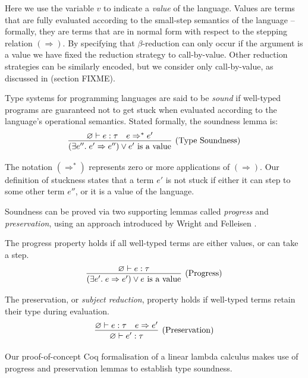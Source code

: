 \documentclass[]{unswthesis}
\let\emptyset\varnothing
\newcommand{\steps}{\Rightarrow}
\newcommand{\types}{\vdash}
\let\i\textit
\let\t\text
\begin{document}
Here we use the variable $v$ to indicate a \i{value} of the language. Values are terms that are fully evaluated according to the small-step semantics of the language \cite{tapl} -- formally, they are terms that are in normal form with respect to the stepping relation $(\steps)$. By specifying that $\beta$-reduction can only occur if the argument is a value we have fixed the reduction strategy to call-by-value. Other reduction strategies can be similarly encoded, but we consider only call-by-value, as discussed in (section FIXME).


Type systems for programming languages are said to be \i{sound} if well-typed programs are guaranteed not to get stuck when evaluated according to the language's operational semantics. Stated formally, the soundness lemma is:
\begin{eqnarray*}
\infer[\t{(Type Soundness)}]
{(\exists e''. \; e' \steps e'') \lor \t{$e'$ is a value}}
{\emptyset \types e : \tau  &  e \steps^* e'}
\end{eqnarray*}

The notation $(\steps^*)$ represents zero or more applications of $(\steps)$. Our definition of stuckness states that a term $e'$ is not stuck if either it can step to some other term $e''$, or it is a value of the language.

Soundness can be proved via two supporting lemmas called \i{progress} and \i{preservation}, using an approach introduced by Wright and Felleisen \cite{wright94}.

The progress property holds if all well-typed terms are either values, or can take a step.
\begin{eqnarray*}
\infer[\t{(Progress)}]
{(\exists e'. \; e \steps e') \lor \t{$e$ is a value}}
{\emptyset \types e : \tau}
\end{eqnarray*}

The preservation, or \i{subject reduction}, property holds if well-typed terms retain their type during evaluation.
\begin{eqnarray*}
\infer[\t{(Preservation)}]
{\emptyset \types e' : \tau}
{\emptyset \types e : \tau  &  e \steps e'}
\end{eqnarray*}

Our proof-of-concept Coq formalisation of a linear lambda calculus makes use of progress and preservation lemmas to establish type soundness.
\end{document}
